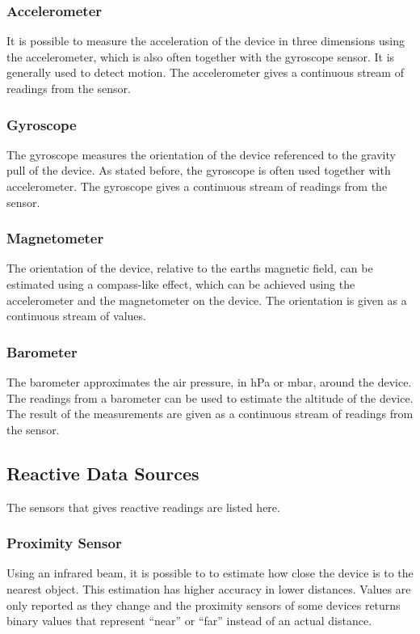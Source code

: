 \subsubsection{Accelerometer}
\label{sub:accelerometer}
It is possible to measure the acceleration of the device in three dimensions using the accelerometer, which is also often together with the gyroscope sensor. It is generally used to detect motion. The accelerometer gives a continuous stream of readings from the sensor.

\subsubsection{Gyroscope}
\label{sub:gyroscope}
The gyroscope measures the orientation of the device referenced to the gravity pull of the device. As stated before, the gyroscope is often used together with accelerometer. The gyroscope gives a continuous stream of readings from the sensor.

\subsubsection{Magnetometer}
\label{sub:compass}
The orientation of the device, relative to the earths magnetic field, can be estimated using a compass-like effect, which can be achieved using the accelerometer and the magnetometer on the device. The orientation is given as a continuous stream of values.

\subsubsection{Barometer}
\label{sub:barometer}
The barometer approximates the air pressure, in hPa or mbar, around the device. The readings from a barometer can be used to estimate the altitude of the device. The result of the measurements are given as a continuous stream of readings from the sensor. 

\subsection{Reactive Data Sources}
\label{sub:on_change_reporting_sensors}
The sensors that gives reactive readings are listed here.

\subsubsection{Proximity Sensor}
\label{sub:proximity_sensor}
Using an infrared beam, it is possible to to estimate how close the device is to the nearest object. This estimation has higher accuracy in lower distances. Values are only reported as they change and the proximity sensors of some devices returns binary values that represent ``near'' or ``far'' instead of an actual distance.

